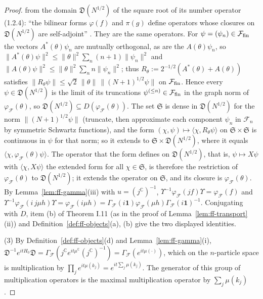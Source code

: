 \documentclass[11pt,a4paper]{article}
\theoremstyle{plain}
\theoremstyle{definition}
\theoremstyle{plain}
\theoremstyle{definition}
\newcommand{\C}{\mathbb{C}}
\newcommand{\ip}[2]{\langle #1,#2\rangle}
\begin{document}
\begin{proof}
from the domain $\mathfrak D(N^{1/2})$ of the square root of its number operator (1.2.4): ``the
bilinear forms $\varphi(f)$ and $\pi(g)$ define operators whose closures on $\mathfrak
D(N^{1/2})$ are self-adjoint'' \cite[p.~365]{GJ2}.  They are the same operators.  For
$\psi=(\psi_n)\in\mathcal F_{\rm fin}$ the vectors $A^*(\theta)\psi_n$ are mutually orthogonal,
as are the $A(\theta)\psi_n$, so $\|A^*(\theta)\psi\|^2\le\|\theta\|^2\sum_n(n+1)\|\psi_n\|^2$
and $\|A(\theta)\psi\|^2\le\|\theta\|^2\sum_nn\|\psi_n\|^2$; thus
$R_\theta:=2^{-1/2}(A^*(\theta)+A(\theta))$ satisfies $\|R_\theta\psi\|\le\sqrt2\,\|\theta\|\,
\|(N+1)^{1/2}\psi\|$ on $\mathcal F_{\rm fin}$.  Hence every $\psi\in\mathfrak D(N^{1/2})$ is
the limit of its truncations $\psi^{(\le n)}\in\mathcal F_{\rm fin}$ in the graph norm of
$\varphi_{\mathcal F}(\theta)$, so $\mathfrak D(N^{1/2})\subseteq D(\varphi_{\mathcal
F}(\theta))$.  The set $\mathfrak S$ is dense in $\mathfrak D(N^{1/2})$ for the norm
$\|(N+1)^{1/2}\psi\|$ (truncate, then approximate each component $\psi_n$ in $\mathcal F_n$ by
symmetric Schwartz functions), and the form $(\chi,\psi)\mapsto\ip\chi{R_\theta\psi}$ on
$\mathfrak S\times\mathfrak S$ is continuous in $\psi$ for that norm; so it extends to
$\mathfrak S\times\mathfrak D(N^{1/2})$, where it equals $\ip\chi{\varphi_{\mathcal
F}(\theta)\psi}$.  The operator that the form defines on $\mathfrak D(N^{1/2})$, that is,
$\psi\mapsto X\psi$ with $\ip\chi{X\psi}$ the extended form for all $\chi\in\mathfrak S$, is
therefore the restriction of $\varphi_{\mathcal F}(\theta)$ to $\mathfrak D(N^{1/2})$; it
extends the operator on $\mathfrak S$, and its closure is $\varphi_{\mathcal F}(\theta)$.  By Lemma~\ref{lem:ff-gamma}(iii)
with $u=(j^{\C})^{-1}$, $\Upsilon^{-1}\varphi_{\mathcal F}(jf)\Upsilon=\varphi_{\mathcal F}(f)$ and
$\Upsilon^{-1}\varphi_{\mathcal F}(i\,j\mu h)\Upsilon=\varphi_{\mathcal F}(i\mu h)=
\Gamma_{\!\mathcal F}(i\mathbf 1)\varphi_{\mathcal F}(\mu h)\Gamma_{\!\mathcal F}(i\mathbf
1)^{-1}$.  Conjugating with $D$, item (b) of Theorem I.11 (as in the proof of
Lemma~\ref{lem:ff-transport}(ii)) and Definition~\ref{def:ff-objects}(a), (b) give the two
displayed identities.

(3) By Definition~\ref{def:ff-objects}(d) and Lemma~\ref{lem:ff-gamma}(i),
$\mathfrak D^{-1}e^{itH_0}\mathfrak D=\Gamma_{\!\mathcal F}(j^{\C}e^{it\mu^{\C}}(j^{\C})^{-1})=
\Gamma_{\!\mathcal F}(e^{it\mu(\cdot)})$, which on the $n$-particle space is multiplication by
$\prod_je^{it\mu(k_j)}=e^{it\sum_j\mu(k_j)}$.  The generator of this group of multiplication
operators is the maximal multiplication operator by $\sum_j\mu(k_j)$.


\end{proof}
\end{document}
